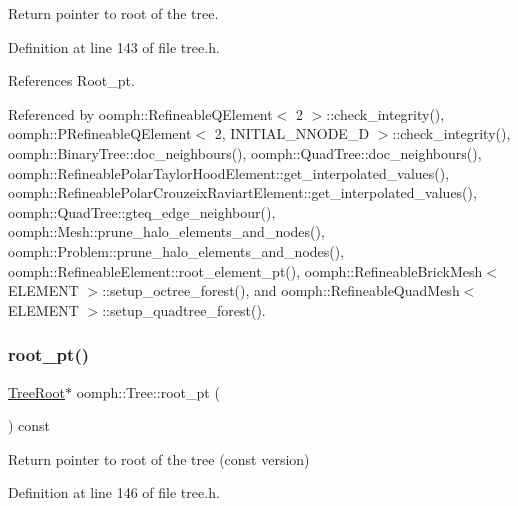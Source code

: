 Return pointer to root of the tree. 



Definition at line 143 of file tree.\+h.



References Root\+\_\+pt.



Referenced by oomph\+::\+Refineable\+Q\+Element$<$ 2 $>$\+::check\+\_\+integrity(), oomph\+::\+P\+Refineable\+Q\+Element$<$ 2, I\+N\+I\+T\+I\+A\+L\+\_\+\+N\+N\+O\+D\+E\+\_\+D $>$\+::check\+\_\+integrity(), oomph\+::\+Binary\+Tree\+::doc\+\_\+neighbours(), oomph\+::\+Quad\+Tree\+::doc\+\_\+neighbours(), oomph\+::\+Refineable\+Polar\+Taylor\+Hood\+Element\+::get\+\_\+interpolated\+\_\+values(), oomph\+::\+Refineable\+Polar\+Crouzeix\+Raviart\+Element\+::get\+\_\+interpolated\+\_\+values(), oomph\+::\+Quad\+Tree\+::gteq\+\_\+edge\+\_\+neighbour(), oomph\+::\+Mesh\+::prune\+\_\+halo\+\_\+elements\+\_\+and\+\_\+nodes(), oomph\+::\+Problem\+::prune\+\_\+halo\+\_\+elements\+\_\+and\+\_\+nodes(), oomph\+::\+Refineable\+Element\+::root\+\_\+element\+\_\+pt(), oomph\+::\+Refineable\+Brick\+Mesh$<$ E\+L\+E\+M\+E\+N\+T $>$\+::setup\+\_\+octree\+\_\+forest(), and oomph\+::\+Refineable\+Quad\+Mesh$<$ E\+L\+E\+M\+E\+N\+T $>$\+::setup\+\_\+quadtree\+\_\+forest().

\mbox{\label{classoomph_1_1Tree_a3e4dee01da0a463c4a3a5be574943632}} 
\subsubsection{\texorpdfstring{root\+\_\+pt()}{root\_pt()}\hspace{0.1cm}{\footnotesize\ttfamily [2/2]}}
{\footnotesize\ttfamily \hyperlink{classoomph_1_1TreeRoot}{Tree\+Root}$\ast$ oomph\+::\+Tree\+::root\+\_\+pt (\begin{DoxyParamCaption}{ }\end{DoxyParamCaption}) const\hspace{0.3cm}{\ttfamily [inline]}}



Return pointer to root of the tree (const version) 



Definition at line 146 of file tree.\+h.




